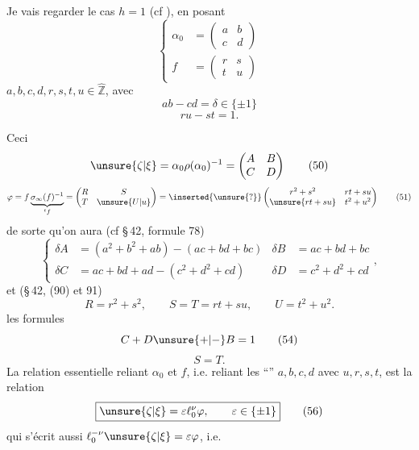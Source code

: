 

Je vais regarder le cas $h=1$ (cf ), en posant
\[
\left\{\begin{aligned}
 \alpha_0&=\begin{pmatrix}a&b\\c&d\end{pmatrix}\\
 f&=\begin{pmatrix}r&s\\t&u\end{pmatrix}
\end{aligned}\right.
\tag{47}
\]
 $a,b,c,d,r,s,t,u\in\widehat{\mathbb Z}$, avec
\[
 \boxed{ab-cd=\delta\in\{\pm1\}}
 \tag{48}
\]
\[
 \boxed{ru-st=1}.
 \tag{49}
\]

Ceci 
\[
 \unsure{\zeta|\xi}=\alpha_0\rho(\alpha_0)^{-1}
 =\begin{pmatrix}A&B\\C&D\end{pmatrix}
 \tag{50}
\]
\[
 \varphi=f\underbrace{\sigma_\infty(f)^{-1}}_{{}^{t}f}
 =\begin{pmatrix}R&S\\T&\unsure{U|u}\end{pmatrix}
 =\inserted{\unsure{?}}
 \begin{pmatrix}r^2+s^2&rt+su\\\unsure{rt+su}&t^2+u^2\end{pmatrix}
 \tag{51}
\]
de sorte qu'on aura (cf \S\,42, formule 78)
\[
\left\{\begin{aligned}
 \delta A&=(a^2+b^2+ab)-(ac+bd+bc)
 &\delta B&=ac+bd+bc\\
 \delta C&=ac+bd+ad-(c^2+d^2+cd)
 &\delta D&=c^2+d^2+cd
\end{aligned}\right.,
\tag{52}
\]
et (\S\,42, (90) et 91)
\[
 R=r^2+s^2,\qquad S=T=rt+su,\qquad U=t^2+u^2.
 \tag{53}
\]
 les formules
\[
 C+D\unsure{+|-}B=1
 \tag{54}
\]
\[
 S=T.
 \tag{55}
\]
La relation essentielle reliant $\alpha_0$ et $f$, i.e. reliant les ``'' $a,b,c,d$ avec $u,r,s,t$, est la relation
\[
 \boxed{\unsure{\zeta|\xi}=\varepsilon\ell_0^\nu\varphi,\qquad\varepsilon\in\{\pm1\}}
 \tag{56}
\]
qui s'écrit aussi $\ell_0^{-\nu}\unsure{\zeta|\xi}=\varepsilon\varphi$, i.e.
